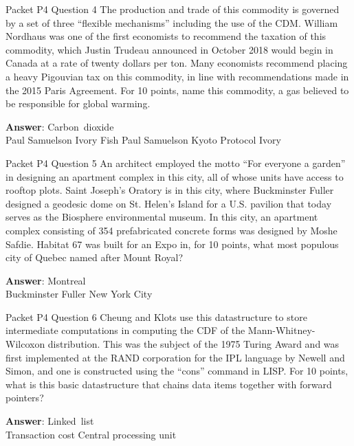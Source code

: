 \begin{frame}{Packet P4 Question 4}
The production and trade of this commodity is governed by a set of three “flexible mechanisms” including the use of the CDM. William Nordhaus   was one of the first economists to recommend the taxation of this commodity, which Justin Trudeau announced in October 2018 would begin in Canada at a rate of twenty dollars per ton. Many economists recommend placing a heavy Pigouvian tax on   this commodity, in line with recommendations made in the 2015 Paris Agreement. For 10 points, name this commodity, a gas believed to be responsible for global warming.        

\textbf{Answer}: Carbon\ dioxide\\
 Paul Samuelson
 Ivory
 Fish
 Paul Samuelson
 Kyoto Protocol
 Ivory
\end{frame}

\begin{frame}{Packet P4 Question 5}
An architect employed the motto “For everyone a garden” in designing an apartment complex in this city, all of whose units have access to rooftop plots. Saint Joseph’s Oratory is in this city, where Buckminster   Fuller designed a geodesic dome on St. Helen’s Island for a U.S. pavilion that today serves as the Biosphere environmental   museum. In this city, an apartment complex consisting of 354 prefabricated concrete forms was designed by Moshe Safdie. Habitat   67 was built for an Expo in, for 10 points, what most populous city of Quebec named   after Mount Royal?  

\textbf{Answer}: Montreal\\
 Buckminster Fuller
 New York City
\end{frame}

\begin{frame}{Packet P4 Question 6}
Cheung and Klots use this   datastructure to store intermediate computations in computing the CDF of the Mann-Whitney-Wilcoxon   distribution.  This was the subject of the 1975 Turing Award and was first implemented at the RAND   corporation for the IPL language by Newell and Simon, and one is constructed using the ``cons'' command     in LISP.  For 10 points, what is this basic datastructure that chains data items   together with forward pointers?

\textbf{Answer}: Linked\ list\\
 Transaction cost
 Central processing unit
\end{frame}


